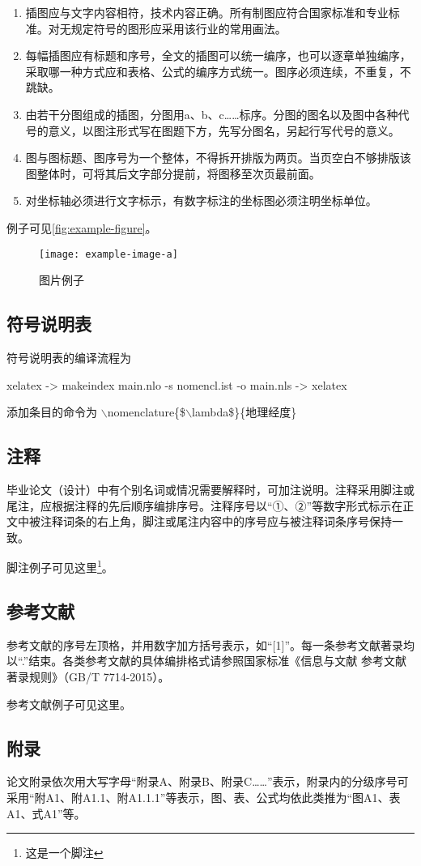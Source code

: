 \begin{enumerate}
    \item 插图应与文字内容相符，技术内容正确。所有制图应符合国家标准和专业标准。对无规定符号的图形应采用该行业的常用画法。
    \item 每幅插图应有标题和序号，全文的插图可以统一编序，也可以逐章单独编序，采取哪一种方式应和表格、公式的编序方式统一。图序必须连续，不重复，不跳缺。
    \item 由若干分图组成的插图，分图用a、b、c……标序。分图的图名以及图中各种代号的意义，以图注形式写在图题下方，先写分图名，另起行写代号的意义。
    \item 图与图标题、图序号为一个整体，不得拆开排版为两页。当页空白不够排版该图整体时，可将其后文字部分提前，将图移至次页最前面。
    \item 对坐标轴必须进行文字标示，有数字标注的坐标图必须注明坐标单位。
\end{enumerate}

例子可见\autoref{fig:example-figure}。

\begin{figure}[!htbp]
    \centering
    \texttt{[image: example-image-a]}
    \caption{图片例子}
    \label{fig:example-figure}
\end{figure}

\subsection{符号说明表}
符号说明表的编译流程为

xelatex -> makeindex main.nlo -s nomencl.ist -o main.nls -> xelatex

添加条目的命令为
$\backslash$nomenclature\{\$$\backslash$lambda\$\}\{地理经度\}

\subsection{注释}

毕业论文（设计）中有个别名词或情况需要解释时，可加注说明。注释采用脚注或尾注，应根据注释的先后顺序编排序号。注释序号以``①、②''等数字形式标示在正文中被注释词条的右上角，脚注或尾注内容中的序号应与被注释词条序号保持一致。

脚注例子可见这里\footnote{这是一个脚注}。

\subsection{参考文献}

参考文献的序号左顶格，并用数字加方括号表示，如``[1]''。每一条参考文献著录均以``.''结束。各类参考文献的具体编排格式请参照国家标准《信息与文献 参考文献著录规则》（GB/T 7714-2015）。

参考文献例子可见这里\cite{sysu-thesis}。


\subsection{附录}

论文附录依次用大写字母``附录A、附录B、附录C……''表示，附录内的分级序号可采用``附A1、附A1.1、附A1.1.1''等表示，图、表、公式均依此类推为``图A1、表A1、式A1''等。

